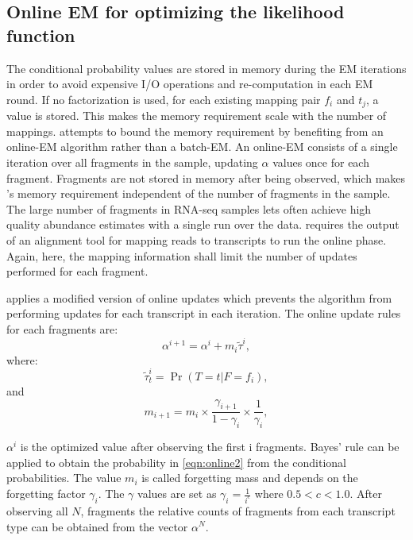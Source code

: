 \subsection{Online EM for optimizing the likelihood function}

The conditional probability values are stored in memory during the EM iterations 
in order to avoid expensive I/O operations and re-computation in each EM round. 
If no factorization is used, for each existing mapping pair $f_i$ and $t_j$, 
a value is stored. This makes the memory requirement scale with the number of 
mappings. \express \citep{Roberts2013Express} attempts to bound the memory 
requirement by benefiting from an online-EM algorithm rather than a batch-EM. 
An online-EM consists of a single iteration over all fragments in the sample, 
updating $\alpha$ values once for each fragment. Fragments are not stored in 
memory after being observed, which makes \express's memory requirement 
independent of the number of fragments in the sample. The large number of 
fragments in RNA-seq samples lets \express often achieve high quality abundance 
estimates with a single run over the data. \express requires the output 
of an alignment tool for mapping reads to transcripts to run the online phase. 
Again, here, the mapping information shall limit the number of updates performed 
for each fragment. 

\express applies a modified version of online updates which prevents the 
algorithm from performing updates for each transcript in each iteration. 
The online update rules for each fragments are:
\begin{equation}
\alpha^{i+1} = \alpha^{i}+m_i\tilde{\tau}^i,
\label{eqn:online1}
\end{equation}
where:
\begin{equation}
\tilde{\tau}^i_t =\Pr{(T=t|F=f_i)},
\label{eqn:online2}
\end{equation}
and
\begin{equation}
m_{i+1} = m_i \times \frac{\gamma_{i+1}}{1-\gamma_i} \times \frac{1}{\gamma_i},
\label{eqn:online3}
\end{equation}

$\alpha^i$ is the optimized value after observing the first i fragments. 
Bayes' rule can be applied to obtain the probability in \cref{eqn:online2} 
from the conditional probabilities. The value $m_i$ is called forgetting 
mass and depends on the forgetting factor $\gamma_i$. The $\gamma$ values 
are set as $\gamma_i=\frac{1}{i^c}$ where $0.5<c<1.0$. After observing 
all $N$, fragments the relative counts of fragments from each transcript type 
can be obtained from the vector $\alpha^N$.

